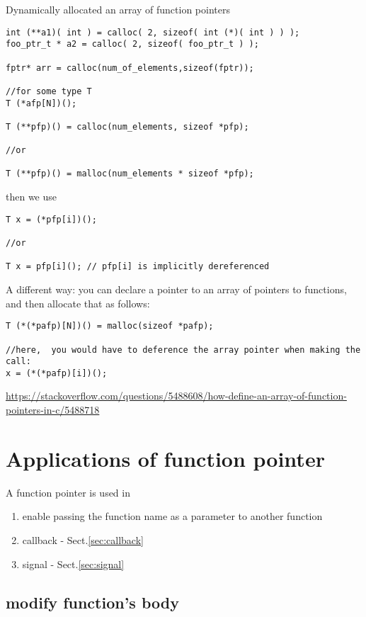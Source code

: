 Dynamically allocated an array of function pointers
\begin{verbatim}
int (**a1)( int ) = calloc( 2, sizeof( int (*)( int ) ) );
foo_ptr_t * a2 = calloc( 2, sizeof( foo_ptr_t ) );

fptr* arr = calloc(num_of_elements,sizeof(fptr));

//for some type T
T (*afp[N])(); 

T (**pfp)() = calloc(num_elements, sizeof *pfp);

//or

T (**pfp)() = malloc(num_elements * sizeof *pfp);
\end{verbatim}
then we use
\begin{verbatim}
T x = (*pfp[i])();

//or

T x = pfp[i](); // pfp[i] is implicitly dereferenced
\end{verbatim}

A different way:  you can declare a pointer to an array of pointers to functions, and then allocate that as follows:
\begin{verbatim}
T (*(*pafp)[N])() = malloc(sizeof *pafp);

//here,  you would have to deference the array pointer when making the call:
x = (*(*pafp)[i])();
\end{verbatim}

\url{https://stackoverflow.com/questions/5488608/how-define-an-array-of-function-pointers-in-c/5488718}

\section{Applications of function pointer}

A function pointer is used in 
\begin{enumerate}
  \item enable passing the function name as a parameter to another function  
  
  \item callback - Sect.\ref{sec:callback}
  
  \item signal - Sect.\ref{sec:signal}
\end{enumerate}

\subsection{modify function's body}


